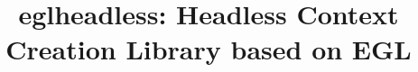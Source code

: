 \documentclass{article}
\begin{document}
\title{eglheadless: Headless Context Creation Library based on EGL}

\maketitle

\begin{abstract}
\end{abstract}

\setcounter{tocdepth}{2}
\tableofcontents

\newpage
\end{document}
